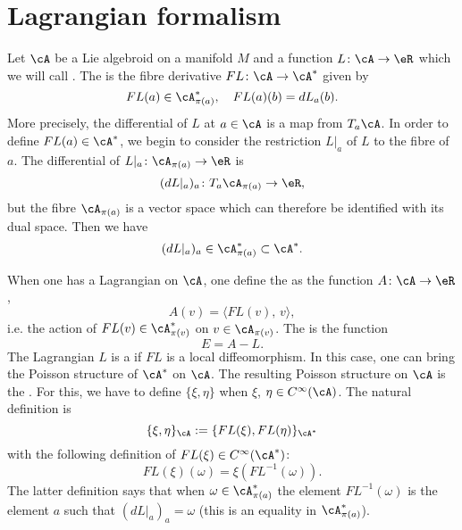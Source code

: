 \section{Lagrangian formalism}

Let $\cA$ be a Lie algebroid on a manifold $M$ and a function $L\colon \cA\to \eR$ which we will call . The  is the fibre derivative $FL\colon \cA\to \cA^*$ given by
\begin{equation}
	FL(a)\in\cA^*_{\pi(a)},\quad FL(a)(b)=dL_{a}(b).
\end{equation}
More precisely, the differential of $L$ at $a\in \cA$ is a map from $T_{a}\cA$. In order to define $FL(a)\in\cA^*$, we begin to consider the restriction $L|_{a}$ of $L$ to the fibre of $a$. The differential of $L|_{a}\colon \cA_{\pi(a)}\to \eR$ is
\[
	(dL|_{a})_{a}\colon T_{a}\cA_{\pi(a)}\to \eR,
\]
but the fibre $\cA_{\pi(a)}$ is a vector space which can therefore be identified with its dual space. Then we have
\[
	(dL|_{a})_{a}\in\cA^*_{\pi(a)}\subset\cA^*.
\]

When one has a Lagrangian on $\cA$, one define the  as the function $A\colon \cA\to \eR$,
\begin{equation}
	A(v)=\langle FL(v),\,v\rangle,
\end{equation}
i.e. the action of $FL(v)\in\cA^*_{\pi(v)}$ on $v\in\cA_{\pi(v)}$. The  is the function
\[
	E=A-L.
\]
The Lagrangian $L$ is a  if $FL$ is a local diffeomorphism. In this case, one can bring the Poisson structure of $\cA^*$ on $\cA$. The resulting Poisson structure on $\cA$ is the . For this, we have to define $\{ \xi,\eta \}$ when $\xi$, $\eta\in C^{\infty}(\cA)$. The natural definition is
\begin{equation}
	\{ \xi,\eta \}_{\cA}:=\{ FL(\xi),FL(\eta) \}_{\cA^*}
\end{equation}
with the following definition of $FL(\xi)\in  C^{\infty}(\cA^*)$:
\begin{equation}
	FL(\xi)(\omega)=\xi(FL^{-1}(\omega)).
\end{equation}
The latter definition says that when $\omega\in\cA^*_{\pi(a)}$ the element $FL^{-1}(\omega)$ is the element $a$ such that $(dL|_{a})_{a}=\omega$ (this is an equality in $\cA^*_{\pi(a)}$).

